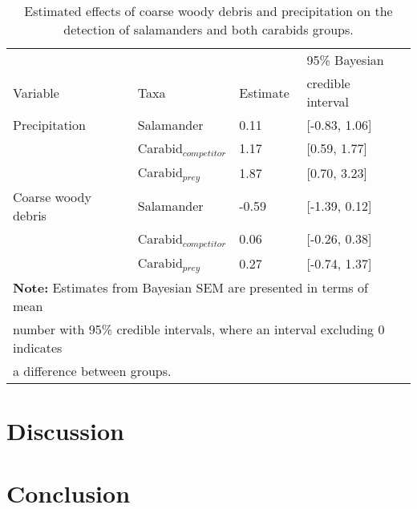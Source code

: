 \begin{table}[ht]
  \centering
  \caption[Estimated effects of coarse woody debris and precipitation on the detection of salamanders and both carabids groups]
  {Estimated effects of coarse woody debris and precipitation on the detection of salamanders and both carabids groups.}
  \label{tab:detection}
  \begin{tabular}{lllll} 
      \hline
      &&&95\% Bayesian \\
      Variable & Taxa & Estimate &  credible interval \\ [0.5ex] 
      \hline      
      Precipitation       & Salamander              & \hspace{1mm}0.11 & [-0.83, 1.06] \\ 
                          & Carabid$_{competitor}$  & \hspace{1mm}1.17 & [0.59, 1.77] \\ 
                          & Carabid$_{prey}$        & \hspace{1mm}1.87 & [0.70, 3.23] \\       
      Coarse woody debris & Salamander              & -0.59 & [-1.39, 0.12] \\ 
                          & Carabid$_{competitor}$  & \hspace{1mm}0.06 & [-0.26, 0.38] \\ 
                          & Carabid$_{prey}$        & \hspace{1mm}0.27 & [-0.74, 1.37] \\   

      \hline
      \multicolumn{4}{l}{\textbf{Note:} Estimates from Bayesian SEM are presented in terms of mean} \\
      \multicolumn{4}{l}{number with 95\% credible intervals, where an interval excluding 0 indicates} \\
      \multicolumn{4}{l}{a difference between groups.} \\
  \end{tabular}
\end{table}

\clearpage

\section*{Discussion}
\label{sec:discu1}

\section*{Conclusion}
\label{sec:conclu1}

